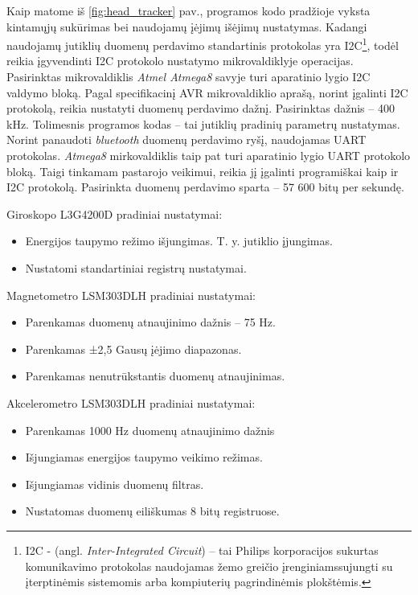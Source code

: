\documentclass[]{vgtuef}
\begin{document}
Kaip matome iš \ref{fig:head_tracker} pav., programos kodo pradžioje vyksta kintamųjų sukūrimas bei naudojamų įėjimų išėjimų nustatymas. Kadangi naudojamų jutiklių duomenų perdavimo standartinis protokolas yra I2C\footnote{  I2C - (angl. \textit{Inter-Integrated Circuit}) -- tai Philips korporacijos sukurtas komunikavimo protokolas naudojamas žemo greičio įrenginiamssujungti su įterptinėmis sistemomis arba kompiuterių pagrindinėmis plokštėmis.}, todėl reikia įgyvendinti I2C protokolo nustatymo mikrovaldiklyje operacijas. Pasirinktas mikrovaldiklis \textit{Atmel Atmega8} savyje turi aparatinio lygio I2C valdymo bloką. Pagal specifikacinį AVR mikrovaldiklio aprašą, norint įgalinti I2C protokolą, reikia nustatyti duomenų perdavimo dažnį. Pasirinktas dažnis – 400 kHz. Tolimesnis programos kodas – tai jutiklių pradinių parametrų nustatymas. Norint panaudoti \textit{bluetooth} duomenų perdavimo ryšį, naudojamas UART protokolas. \textit{Atmega8} mirkovaldiklis taip pat turi aparatinio lygio UART protokolo bloką. Taigi tinkamam pastarojo veikimui, reikia jį įgalinti programiškai kaip ir I2C protokolą. Pasirinkta duomenų perdavimo sparta – 57 600 bitų per sekundę.

\noindent
Giroskopo L3G4200D pradiniai nustatymai:

\begin{itemize}
\item Energijos taupymo režimo išjungimas. T. y. jutiklio įjungimas.
\item Nustatomi standartiniai registrų nustatymai.
\end{itemize}

\noindent
Magnetometro LSM303DLH pradiniai nustatymai:

\begin{itemize}
\item Parenkamas duomenų atnaujinimo dažnis – 75 Hz.
\item Parenkamas ±2,5 Gausų įėjimo diapazonas.
\item Parenkamas nenutrūkstantis duomenų atnaujinimas.
\end{itemize}

\noindent
Akcelerometro LSM303DLH pradiniai nustatymai:

\begin{itemize}
\item Parenkamas 1000 Hz duomenų atnaujinimo dažnis
\item Išjungiamas energijos taupymo veikimo režimas.
\item Išjungiamas vidinis duomenų filtras. 
\item Nustatomas duomenų eiliškumas 8 bitų registruose.
\end{itemize}
\end{document}

